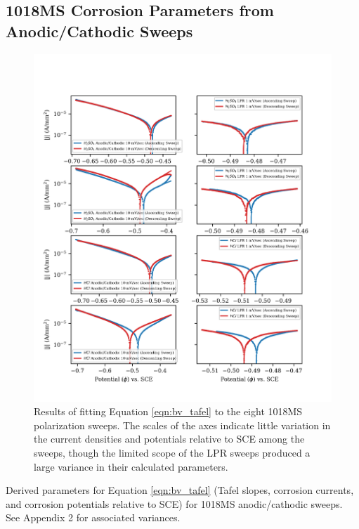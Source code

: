 \subsection{1018MS Corrosion Parameters from Anodic/Cathodic Sweeps}

	\begin{figure}[h!]
		\centering
		\includegraphics[width=5.0in]{resources/fig_2b.png}
		\caption{Results of fitting Equation \ref{eqn:bv_tafel} to the eight 1018MS polarization sweeps.  The scales of the axes indicate little variation in the current densities and potentials relative to SCE among the sweeps, though the limited scope of the LPR sweeps produced a large variance in their calculated parameters.}
		\label{fig:anocat}
	\end{figure}

	\begin{table}[h!]
		\centering
		
		\caption{Derived parameters for Equation \ref{eqn:bv_tafel} (Tafel slopes, corrosion currents, and corrosion potentials relative to SCE) for 1018MS anodic/cathodic sweeps.  See Appendix 2 for associated variances.}
		\label{table:anocat}
	\end{table}

